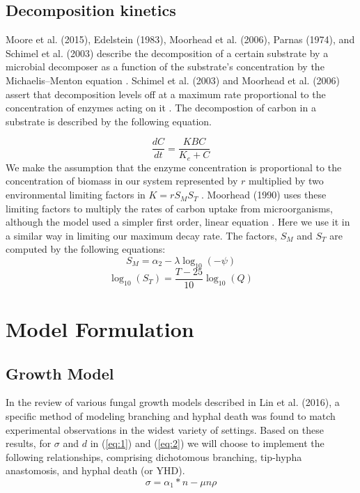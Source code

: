 \documentclass[12pt]{article}
\begin{document}
\begin{multicols}{2}
\subsection{Decomposition kinetics}
Moore et al. (2015), Edelstein (1983), Moorhead et al. (2006), Parnas (1974), and Schimel et al. (2003) describe the decomposition of a certain substrate by a microbial decomposer as a function of the substrate's concentration by the Michaelis–Menton equation \cite{Moore2015, Edelstein1983, Moorhead2006, Parnas1975, Schimel2003}. Schimel et al. (2003) and Moorhead et al. (2006) assert that decomposition levels off at a maximum rate proportional to the concentration of enzymes acting on it \cite{Schimel2003, Moorhead2006}. The decompostion of carbon in a substrate is described by the following equation.

\begin{equation} \label{eq:3}
\frac{dC}{dt} = \frac{KBC}{K_{e}+C}
\end{equation}
We make the assumption that the enzyme concentration is proportional to the concentration of biomass in our system represented by $r$ multiplied by two environmental limiting factors in $K=rS_{M}S_{T}$ \cite{Schimel2003}. Moorhead (1990) uses these limiting factors to multiply the rates of carbon uptake from microorganisms, although the model used a simpler first order, linear equation \cite{Moorhead2006}. Here we use it in a similar way in limiting our maximum decay rate. The factors, $S_{M}$ and $S_{T}$ are computed by the following equations:
\begin{equation}
S_{M}=\alpha_{2} - \lambda \log_{10}(-\psi)
\end{equation}
\begin{equation}
\log_{10}(S_T) = \frac{T-25}{10}\log_{10}(Q)
\end{equation}
\pagebreak
\section{Model Formulation}


\subsection{Growth Model}
In the review of various fungal growth models described in Lin et al. (2016), a specific method of modeling branching and hyphal death was found to match experimental observations in the widest variety of settings. Based on these results, for $\sigma$ and $d$ in (\ref{eq:1}) and (\ref{eq:2}) we will choose to implement the following relationships, comprising dichotomous branching, tip-hypha anastomosis, and hyphal death (or YHD). 
\begin{equation} 
\sigma = \alpha_{1}*n - \mu n \rho
\end{equation}


\end{multicols}
\end{document}
